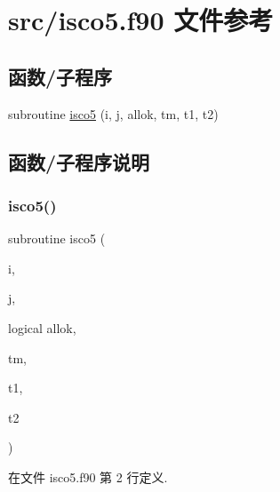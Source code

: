 \hypertarget{isco5_8f90}{}\section{src/isco5.f90 文件参考}
\label{isco5_8f90}
\subsection*{函数/子程序}
\begin{DoxyCompactItemize}
\item 
subroutine \mbox{\hyperlink{isco5_8f90_adb61e2b9a02855f341b1ff319cf61aa8}{isco5}} (i, j, allok, tm, t1, t2)
\end{DoxyCompactItemize}


\subsection{函数/子程序说明}
\mbox{\label{isco5_8f90_adb61e2b9a02855f341b1ff319cf61aa8}} 
\subsubsection{\texorpdfstring{isco5()}{isco5()}}
{\footnotesize\ttfamily subroutine isco5 (\begin{DoxyParamCaption}\item[{}]{i,  }\item[{}]{j,  }\item[{logical}]{allok,  }\item[{}]{tm,  }\item[{}]{t1,  }\item[{}]{t2 }\end{DoxyParamCaption})}



在文件 isco5.\+f90 第 2 行定义.

